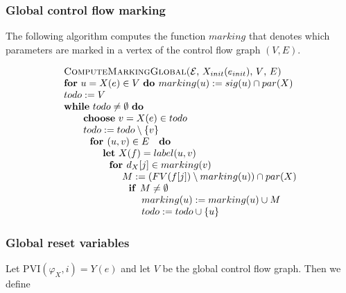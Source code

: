 \newpage

\subsubsection{Global control flow marking}

The following algorithm computes the function $marking$ that denotes which
parameters are marked in a vertex of the control flow graph $(V,E)$.

\begin{equation*}
\begin{tabular}{l}
\textsc{ComputeMarkingGlobal(}$\mathcal{E}$, $X_{init}(e_{init})$, $V$, $E$%
\textsc{)} \\ 
\textbf{for} $u=X(e)\in V$ \textbf{do }$marking(u):=sig(u)\cap par(X)$ \\ 
$todo:=V$ \\ 
\textbf{while} $todo\neq \emptyset $ \textbf{do} \\ 
$\qquad $\textbf{choose} $v=X(e)\in todo$ \\ 
$\qquad todo:=todo\setminus \{v\}$ \\ 
$\qquad \text{\textbf{for }}(u,v)\in E\text{ \textbf{do}}$ \\ 
$\qquad \qquad $\textbf{let} $X(f)=label(u,v)$ \\ 
$\qquad \qquad \text{\textbf{for }}d_{X}[j]\in marking(v)$ \\ 
$\qquad \qquad \qquad M:=(FV(f[j])\setminus marking(u))\cap par(X)$ \\ 
$\qquad \qquad \qquad \text{\textbf{if }}M\neq \emptyset $ \\ 
$\qquad \qquad \qquad \qquad marking(u):=marking(u)\cup M$ \\ 
$\qquad \qquad \qquad \qquad todo:=todo\cup \{u\}$%
\end{tabular}%
\end{equation*}

\subsubsection{Global reset variables}

Let $\mathrm{PVI}(\varphi _{X},i)=Y(e)$ and let $V$ be the global control
flow graph. Then we define

